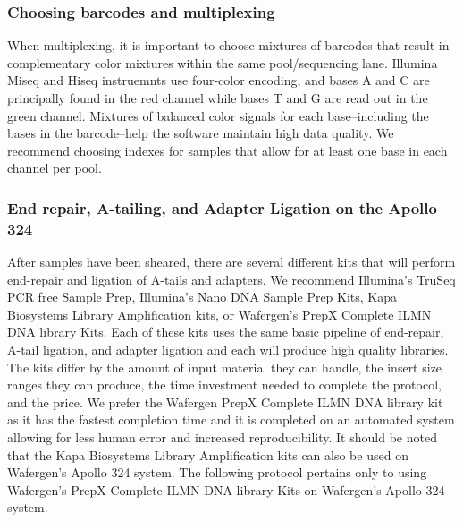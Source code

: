 \documentclass[graybox]{svmult}
\begin{document}
\subsubsection{Choosing barcodes and multiplexing}

When multiplexing, it is important to choose mixtures of barcodes that result in complementary color mixtures within 
the same pool/sequencing lane. Illumina Miseq and Hiseq instruemnts use four-color encoding, and 
bases A and C are principally found in the red channel while bases T and G are read out in the green channel. 
Mixtures of balanced color signals for each base--including the bases in the barcode--help the 
software maintain high data quality.
We recommend choosing indexes for samples that allow for at least one base in each channel per pool.

\subsubsection{End repair, A-tailing, and Adapter Ligation on the Apollo 324}

After samples have been sheared, there are several different kits that will perform end-repair and ligation of A-tails and adapters. We recommend Illumina’s TruSeq PCR free Sample Prep, Illumina's Nano DNA Sample Prep Kits, Kapa Biosystems Library Amplification kits, or Wafergen’s PrepX Complete ILMN DNA library Kits. Each of these kits uses the same basic pipeline of end-repair, A-tail ligation, and adapter ligation and each will produce high quality libraries. The kits differ by the amount of input material they can handle, the insert size ranges they can produce, the time investment needed to complete the protocol, and the price. We prefer the Wafergen PrepX Complete ILMN DNA library kit as it has the fastest completion time and it is completed on an automated system allowing for less human error and increased reproducibility. It should be noted that the Kapa Biosystems Library Amplification kits can also be used on Wafergen’s Apollo 324 system. The following protocol pertains only to using Wafergen’s PrepX Complete ILMN DNA library Kits on Wafergen’s Apollo 324 system.
\end{document}
